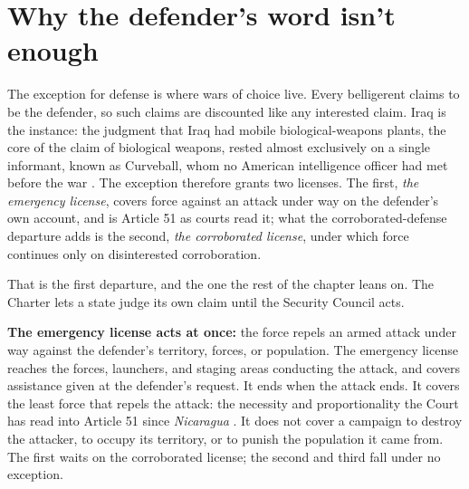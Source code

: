 \section{Why the defender's word isn't enough}
\label{sec:6.2}
The exception for defense is where wars of choice live. Every belligerent claims to be the defender, so such claims are discounted like any interested claim. Iraq is the instance: the judgment that Iraq had mobile biological-weapons plants, the core of the claim of biological weapons, rested almost exclusively on a single informant, known as Curveball, whom no American intelligence officer had met before the war \autocite{wmdcommission2005}. The exception therefore grants two licenses. The first, \emph{the emergency license}, covers force against an attack under way on the defender's own account, and is Article 51 as courts read it; what the corroborated-defense departure adds is the second, \emph{the corroborated license}, under which force continues only on disinterested corroboration.

That is the first departure, and the one the rest of the chapter leans on. The Charter lets a state judge its own claim until the Security Council acts.

\textbf{The emergency license acts at once:} the force repels an armed attack under way against the defender's territory, forces, or population. The emergency license reaches the forces, launchers, and staging areas conducting the attack, and covers assistance given at the defender's request. It ends when the attack ends. It covers the least force that repels the attack: the necessity and proportionality the Court has read into Article 51 since \emph{Nicaragua} \autocite{icj1986nicaragua,icj2003oilplatforms}. It does not cover a campaign to destroy the attacker, to occupy its territory, or to punish the population it came from. The first waits on the corroborated license; the second and third fall under no exception.

